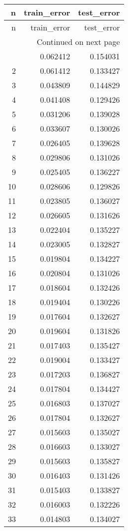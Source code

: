 \begin{longtable}{rrr}
\toprule
n & train_error & test_error \\
\midrule
\endfirsthead
\toprule
n & train_error & test_error \\
\midrule
\endhead
\midrule
\multicolumn{3}{r}{Continued on next page} \\
\midrule
\endfoot
\bottomrule
\endlastfoot
1 & 0.062412 & 0.154031 \\
2 & 0.061412 & 0.133427 \\
3 & 0.043809 & 0.144829 \\
4 & 0.041408 & 0.129426 \\
5 & 0.031206 & 0.139028 \\
6 & 0.033607 & 0.130026 \\
7 & 0.026405 & 0.139628 \\
8 & 0.029806 & 0.131026 \\
9 & 0.025405 & 0.136227 \\
10 & 0.028606 & 0.129826 \\
11 & 0.023805 & 0.136027 \\
12 & 0.026605 & 0.131626 \\
13 & 0.022404 & 0.135227 \\
14 & 0.023005 & 0.132827 \\
15 & 0.019804 & 0.134227 \\
16 & 0.020804 & 0.131026 \\
17 & 0.018604 & 0.132426 \\
18 & 0.019404 & 0.130226 \\
19 & 0.017604 & 0.132627 \\
20 & 0.019604 & 0.131826 \\
21 & 0.017403 & 0.135427 \\
22 & 0.019004 & 0.133427 \\
23 & 0.017203 & 0.136827 \\
24 & 0.017804 & 0.134427 \\
25 & 0.016803 & 0.137027 \\
26 & 0.017804 & 0.132627 \\
27 & 0.015603 & 0.135027 \\
28 & 0.016603 & 0.133027 \\
29 & 0.015603 & 0.135827 \\
30 & 0.016403 & 0.131426 \\
31 & 0.015403 & 0.133827 \\
32 & 0.016003 & 0.132226 \\
33 & 0.014803 & 0.134027 \\

\end{longtable}
